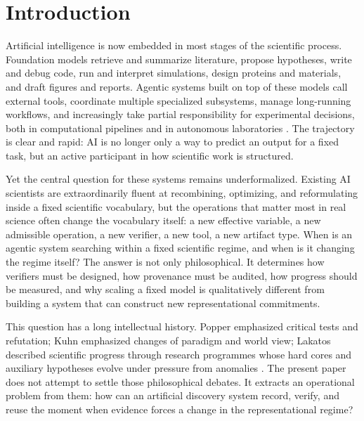 \documentclass[11pt]{article}
\theoremstyle{definition}
\begin{document}
\section{Introduction}

Artificial intelligence is now embedded in most stages of the scientific process. Foundation models retrieve and summarize literature, propose hypotheses, write and debug code, run and interpret simulations, design proteins and materials, and draft figures and reports. Agentic systems built on top of these models call external tools, coordinate multiple specialized subsystems, manage long-running workflows, and increasingly take partial responsibility for experimental decisions, both in computational pipelines and in autonomous laboratories \citep{ghafarollahi_protagents_2024,ghafarollahi_sparks_2025,ghafarollahi_sciagents_2025,lu_ai_scientist_2024,lu_ai_scientist_v2_2025,agarwal_autodiscovery_2026,wang_scienceclaw_infinite_2026,buehler_break_world_2026}. The trajectory is clear and rapid: AI is no longer only a way to predict an output for a fixed task, but an active participant in how scientific work is structured.

Yet the central question for these systems remains underformalized. Existing AI scientists are extraordinarily fluent at recombining, optimizing, and reformulating inside a fixed scientific vocabulary, but the operations that matter most in real science often change the vocabulary itself: a new effective variable, a new admissible operation, a new verifier, a new tool, a new artifact type. When is an agentic system searching within a fixed scientific regime, and when is it changing the regime itself? The answer is not only philosophical. It determines how verifiers must be designed, how provenance must be audited, how progress should be measured, and why scaling a fixed model is qualitatively different from building a system that can construct new representational commitments.

This question has a long intellectual history. Popper emphasized critical tests and refutation; Kuhn emphasized changes of paradigm and world view; Lakatos described scientific progress through research programmes whose hard cores and auxiliary hypotheses evolve under pressure from anomalies \citep{popper_logic_1959,kuhn_structure_1962,lakatos_falsification_1970}. The present paper does not attempt to settle those philosophical debates. It extracts an operational problem from them: how can an artificial discovery system record, verify, and reuse the moment when evidence forces a change in the representational regime?
\end{document}
